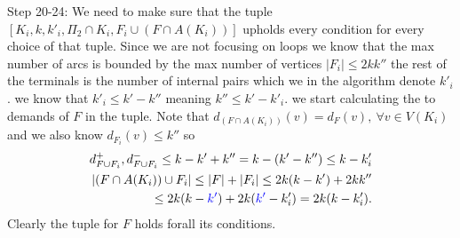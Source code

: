     Step 20-24: We need to make sure that the tuple $[K_i,k,k'_i,\Pi_2 \cap K_i,F_i\cup(F\cap A(K_i))]$ upholds every condition for every choice of that tuple. 
    Since we are not focusing on loops we know that the max number of arcs is bounded by the max number of vertices $|F_i|\leq 2kk''$ the rest of the terminals is the number of internal pairs which we in the algorithm denote $k'_i$. we know that $k'_i\leq k'-k''$ meaning $k''\leq k'-k'_i$.
    we start calculating the to demands of $F$ in the tuple.
    Note that $d_{(F\cap A(K_i))}(v)=d_{F}(v), \ \forall v\in V(K_i)$ and we also know $d_{F_i}(v)\leq k''$ so
    \begin{align}
        d^+_{F\cup F_i},d^-_{F\cup F_i}\leq k-k' + k'' = k-(k'-k'')\leq k- k'_i \\
        |(F \cap A(K_i))\cup F_i|\leq |F|+|F_i|\leq 2k(k-k') +2kk''\\
        \leq 2k(k-\textcolor{blue}{k'})+2k(\textcolor{blue}{k'}-k'_i)=2k(k-k'_i).
    \end{align}
    Clearly the tuple for $F$ holds forall its conditions.


